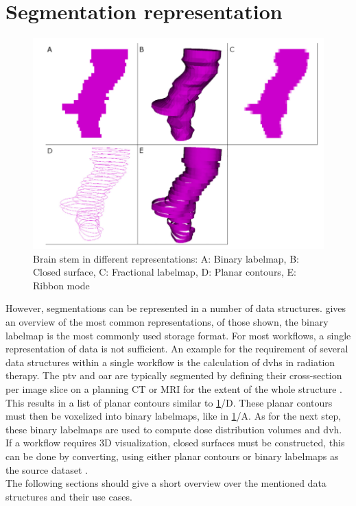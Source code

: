 \section{Segmentation representation}
\begin{figure}[h]
	\centerline{
		\includegraphics[scale=0.5]{images/segRep.png}}
	\caption{Brain stem in different representations: A: Binary labelmap, B: Closed surface, C: Fractional labelmap, D: Planar contours, E: Ribbon mode \cite{pinterPolymorphSegmentationRepresentation2019}}\label{fig:segRep}
\end{figure}
\noindent
However, segmentations can be represented in a number of data structures.
 gives an overview of the most common representations, of those shown, the binary labelmap is the most commonly used storage format.
For most workflows, a single representation of data is not sufficient.
An example for the requirement of several data structures within a single workflow is the calculation of \acrfull{dvh}s in radiation therapy.
The \acrfull{ptv} and \acrfull{oar} are typically segmented by defining their cross-section per
image slice on a planning CT or MRI for the extent of the whole structure \cite{burnetDefiningTumourTarget2004}.
This results in a list of planar contours similar to \cref{fig:segRep}/D.
These planar contours must then be voxelized into binary labelmaps, like in \cref{fig:segRep}/A.
As for the next step, these binary labelmaps are used to compute dose distribution volumes and \acrlong{dvh}.
If a workflow requires 3D visualization, closed surfaces must be constructed, this can be done by converting,
using either planar contours or binary labelmaps as the source dataset \cite{pinterPolymorphSegmentationRepresentation2019}.\\
The following sections should give a short overview over the mentioned data structures and their use cases.

